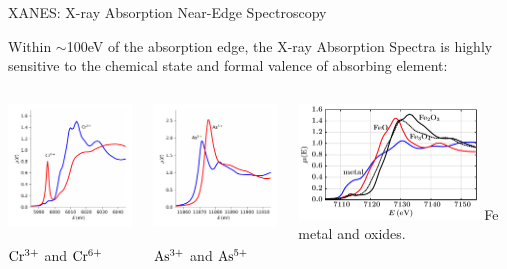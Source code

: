 \begin{slide}{XANES:  X-ray Absorption Near-Edge Spectroscopy}
\begin{cenpage}{120mm}
 Within $\sim$100eV of the absorption edge, the X-ray Absorption Spectra is
 highly sensitive to the chemical state and formal valence of absorbing element:
\end{cenpage}

\begin{cenpage}{150mm}
  \vmm
  \begin{columns}
    \begin{column}{48mm}
      \includegraphics[width=48mm]{figs/xanes/cr}

      \vmm
      \hspace{5mm}  $\rm Cr^{3+}$ and $\rm Cr^{6+}$
    \end{column}
    \begin{column}{48mm}    
      \includegraphics[width=48mm]{figs/xanes/as}
      
      \vmm
      \hspace{5mm}    $\rm As^{3+}$ and $\rm As^{5+}$
    \end{column}

    \begin{column}{48mm}
     \includegraphics[width=48mm]{figs/xanes/fe_oxides}
      \hspace{5mm}    Fe metal and oxides.
    \end{column}
  \end{columns}


\end{cenpage}
\end{slide}

